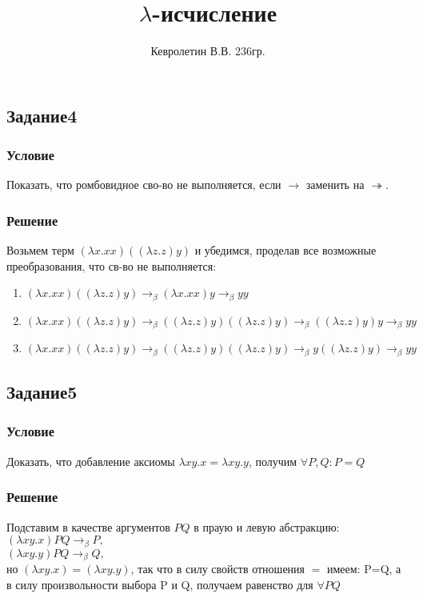 \documentclass[10pt,a4paper]{article}
\author{Кевролетин В.В. 236гр.}
\title{$\lambda$-исчисление}
\begin{document}
\maketitle

\subsection*{Задание4}
\subsubsection*{Условие}
Показать, что ромбовидное сво-во не выполняется, если $\rightarrow $
заменить на $ \twoheadrightarrow $.
\subsubsection*{Решение}
Возьмем терм $(\lambda x.xx)((\lambda z.z)y)$ и убедимся, проделав все возможные
преобразования, что св-во не выполняется: \\
\begin{enumerate}
\item $(\lambda x.xx)((\lambda z.z)y) \longrightarrow_\beta (\lambda
  x.xx)y \longrightarrow_\beta yy$
\item $(\lambda x.xx)((\lambda z.z)y) \longrightarrow_\beta ((\lambda
  z.z)y)((\lambda z.z)y) \longrightarrow_\beta ((\lambda z.z)y)y
  \longrightarrow_\beta yy$
\item $(\lambda x.xx)((\lambda z.z)y) \longrightarrow_\beta ((\lambda
  z.z)y)((\lambda z.z)y) \longrightarrow_\beta y((\lambda z.z)y)
  \longrightarrow_\beta yy$
\end{enumerate}

\subsection*{Задание5}
\subsubsection*{Условие}
Доказать, что добавление аксиомы $\lambda xy.x = \lambda xy.y$,
получим $\forall P,Q: P=Q$
\subsubsection*{Решение}
Подставим в качестве аргументов $PQ$ в праую и левую абстракцию:\\
$(\lambda xy.x)PQ \longrightarrow_\beta P, $\\
$(\lambda xy.y)PQ \longrightarrow_\beta Q, $\\
но $(\lambda xy.x) = (\lambda xy.y)$, так что в силу свойств отношения
$=$ имеем: P=Q, а в силу произвольности выбора P и Q, получаем
равенство для $ \forall PQ $ \\
\end{document}
